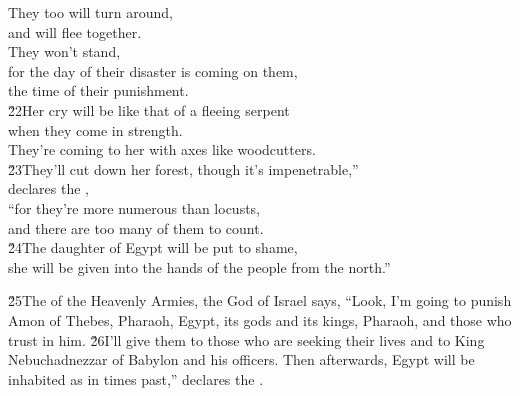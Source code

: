 \begin{poetry}
\poeml They too will turn around, \\
\poemll    and will flee together. \\
\poeml They won't stand, \\
\poemll    for the day of their disaster is coming on them, \\
\poemlll       the time of their punishment. \\
\poeml \v{22}Her cry will be like that of a fleeing serpent \\
\poemll    when they come in strength. \\
\poemlll       They're coming to her with axes like woodcutters. \\
\poeml \v{23}They'll cut down her forest, though it's impenetrable,'' \\
\poemll    declares the , \\
\poeml ``for they're more numerous than locusts, \\
\poemll    and there are too many of them to count. \\
\poeml \v{24}The daughter of Egypt will be put to shame, \\
\poemll    she will be given into the hands of the people from the north.''
\end{poetry}

\v{25}The  of the Heavenly Armies, the God of Israel says, ``Look, I'm going to punish Amon of Thebes, Pharaoh, Egypt, its gods and its kings, Pharaoh, and those who trust in him. \v{26}I'll give them to those who are seeking their lives and to King Nebuchadnezzar of Babylon and his officers. Then afterwards, Egypt will be inhabited as in times past,'' declares the .

